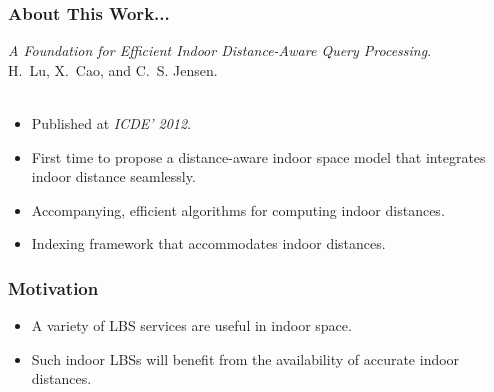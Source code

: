 \begin{frame}
\frametitle{About This Work...}

\emph{A Foundation for Efficient Indoor Distance-Aware Query Processing}.~\cite{DBLP:conf/icde/LuCJ12} \\
H.~Lu, X.~Cao, and C.~S. Jensen.\\~\\

\begin{itemize}
  \item Published at \emph{ICDE' 2012}.
  \item First time to propose a distance-aware indoor space model that integrates indoor distance seamlessly.
  \item Accompanying, efficient algorithms for computing indoor distances.
  \item Indexing framework that accommodates indoor distances.
\end{itemize}

\end{frame}


\begin{frame}
\frametitle{Motivation}

\begin{itemize}
  \item A variety of LBS services are useful in indoor space.

  \item Such indoor LBSs will benefit from the availability of accurate indoor distances.

\end{itemize}

\end{frame}

